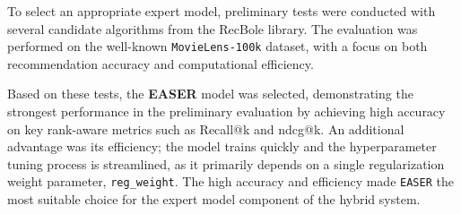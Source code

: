 To select an appropriate expert model, preliminary tests were conducted with several candidate algorithms from the RecBole library. The evaluation was performed on the well-known \texttt{MovieLens-100k} dataset, with a focus on both recommendation accuracy and computational efficiency.

Based on these tests, the \textbf{EASER} model was selected, demonstrating the strongest performance in the preliminary evaluation by achieving high accuracy on key rank-aware metrics such as Recall@k and \acs{ndcg}@k. An additional advantage was its efficiency; the model trains quickly and the hyperparameter tuning process is streamlined, as it primarily depends on a single regularization weight parameter, \texttt{reg\_weight}. The high accuracy and efficiency made \texttt{EASER} the most suitable choice for the expert model component of the hybrid system.